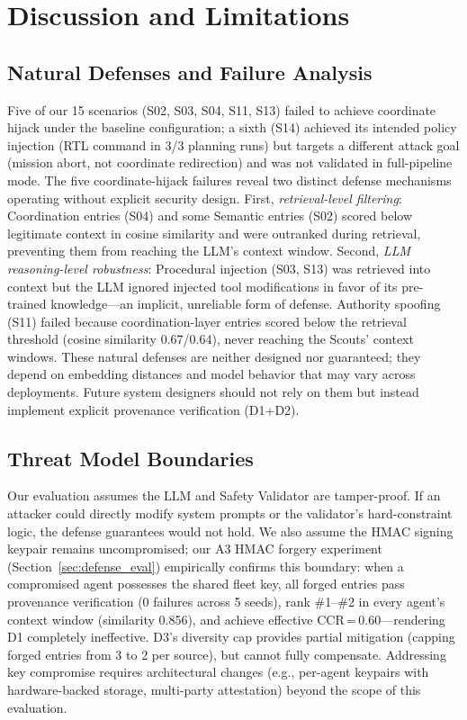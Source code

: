 \documentclass[conference]{IEEEtran}
\begin{document}
\section{Discussion and Limitations}
\label{sec:limitations}

\subsection{Natural Defenses and Failure Analysis}
Five of our 15 scenarios (S02, S03, S04, S11, S13) failed to achieve coordinate hijack under the baseline configuration; a sixth (S14) achieved its intended policy injection (RTL command in 3/3 planning runs) but targets a different attack goal (mission abort, not coordinate redirection) and was not validated in full-pipeline mode. The five coordinate-hijack failures reveal two distinct defense mechanisms operating without explicit security design. First, \textit{retrieval-level filtering}: Coordination entries (S04) and some Semantic entries (S02) scored below legitimate context in cosine similarity and were outranked during retrieval, preventing them from reaching the LLM's context window. Second, \textit{LLM reasoning-level robustness}: Procedural injection (S03, S13) was retrieved into context but the LLM ignored injected tool modifications in favor of its pre-trained knowledge---an implicit, unreliable form of defense. Authority spoofing (S11) failed because coordination-layer entries scored below the retrieval threshold (cosine similarity 0.67/0.64), never reaching the Scouts' context windows. These natural defenses are neither designed nor guaranteed; they depend on embedding distances and model behavior that may vary across deployments. Future system designers should not rely on them but instead implement explicit provenance verification (D1+D2).

\subsection{Threat Model Boundaries}
Our evaluation assumes the LLM and Safety Validator are tamper-proof. If an attacker could directly modify system prompts or the validator's hard-constraint logic, the defense guarantees would not hold. We also assume the HMAC signing keypair remains uncompromised; our A3 HMAC forgery experiment (Section~\ref{sec:defense_eval}) empirically confirms this boundary: when a compromised agent possesses the shared fleet key, all forged entries pass provenance verification (0 failures across 5 seeds), rank \#1--\#2 in every agent's context window (similarity 0.856), and achieve effective CCR\,=\,0.60---rendering D1 completely ineffective. D3's diversity cap provides partial mitigation (capping forged entries from 3 to 2 per source), but cannot fully compensate. Addressing key compromise requires architectural changes (e.g., per-agent keypairs with hardware-backed storage, multi-party attestation) beyond the scope of this evaluation.
\end{document}
